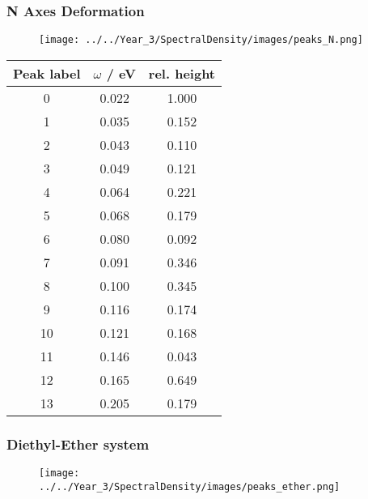 \afterpartskip
\subsubsection{N Axes Deformation}
\label{subsubsec:specdens_N_axes}

\begin{figure}
    \centering
    \texttt{[image: ../../Year\_3/SpectralDensity/images/peaks\_N.png]}
\end{figure}


\begin{table}
    \centering
    \begin{tabular}{||c c c||}
    \hline
    Peak label & $\omega$ / eV & rel. height \\
    \hline\hline
    
     0 & 0.022 & 1.000 \\
     1 & 0.035 & 0.152 \\
     2 & 0.043 & 0.110 \\
     3 & 0.049 & 0.121 \\
     4 & 0.064 & 0.221 \\
     5 & 0.068 & 0.179 \\
     6 & 0.080 & 0.092 \\
     7 & 0.091 & 0.346 \\
     8 & 0.100 & 0.345 \\
     9 & 0.116 & 0.174 \\
     10 & 0.121 & 0.168 \\
     11 & 0.146 & 0.043 \\
     12 & 0.165 & 0.649 \\
     13 & 0.205 & 0.179 \\
    \hline 
    \end{tabular}
\end{table}

\afterpartskip
\subsubsection{Diethyl-Ether system}
\label{subsubsec:specdens_ether}

\begin{figure}
    \centering
    \texttt{[image: ../../Year\_3/SpectralDensity/images/peaks\_ether.png]}
\end{figure}

